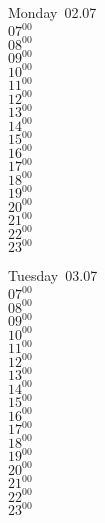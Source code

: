 \documentclass[11pt, a4paper]{book}\usepackage[]{graphicx}\usepackage[]{color}
\begin{document}
\begin{headerbox}
\end{headerbox}
\begin{weekdaybox}
  Monday~02.07\\
  { 
  \vfill
  $07^{00}$\\
$08^{00}$\\
$09^{00}$\\
$10^{00}$\\
$11^{00}$\\
$12^{00}$\\
$13^{00}$\\
$14^{00}$\\
$15^{00}$\\
$16^{00}$\\
$17^{00}$\\
$18^{00}$\\
$19^{00}$\\
$20^{00}$\\
$21^{00}$\\
$22^{00}$\\
$23^{00}$\\
  }
\end{weekdaybox}
\begin{weekdaybox}
  Tuesday~03.07\\
  { 
  \vfill
  $07^{00}$\\
$08^{00}$\\
$09^{00}$\\
$10^{00}$\\
$11^{00}$\\
$12^{00}$\\
$13^{00}$\\
$14^{00}$\\
$15^{00}$\\
$16^{00}$\\
$17^{00}$\\
$18^{00}$\\
$19^{00}$\\
$20^{00}$\\
$21^{00}$\\
$22^{00}$\\
$23^{00}$\\
  }
\end{weekdaybox}
\end{document}
